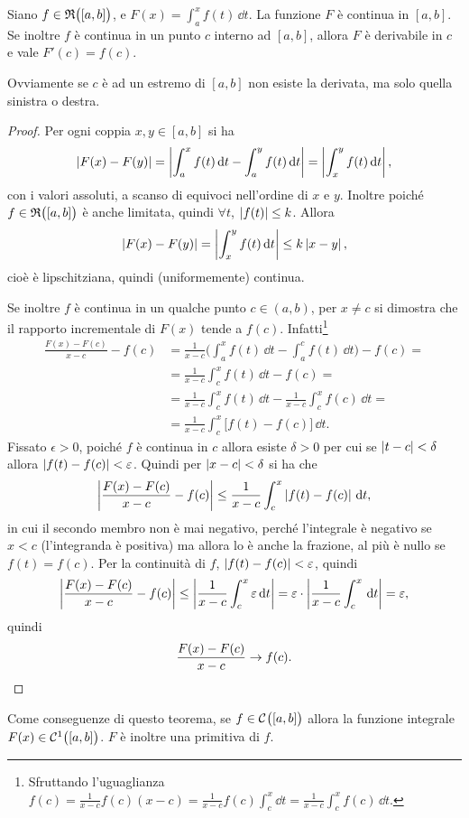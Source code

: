 \begin{teorema} \label{t:tfci1}
Siano $f\in\mathfrak{R}\big([a,b]\big)$, e $F(x)=\int_a^xf(t)\,\dd t$.
La funzione $F$ è continua in $[a,b]$. Se inoltre $f$ è continua in un punto $c$ interno ad $[a,b]$, allora $F$ è derivabile in $c$ e vale $F'(c)=f(c)$.
\end{teorema}
Ovviamente se $c$ è ad un estremo di $[a,b]$ non esiste la derivata, ma solo quella sinistra o destra.
\begin{proof}
Per ogni coppia $x,y\in[a,b]$ si ha
\[
\left|{F(x)-F(y)}\right|=\left|{\int_a^xf(t)\,\textup{d} t-\int_a^yf(t)\,\textup{d} t}\right|=\left|{\int_x^yf(t)\,\textup{d} t}\right|,
\]
con i valori assoluti, a scanso di equivoci nell'ordine di $x$ e $y$. Inoltre poiché $f\in\mathfrak{R}\big([a,b]\big)$ è anche limitata, quindi $\forall t$, $\left|{f(t)}\right|\leq k$. Allora
\[
\left|{F(x)-F(y)}\right|=\left|{\int_x^yf(t)\,\textup{d} t}\right|\leq k\left|{x-y}\right|,
\]
cioè è lipschitziana, quindi (uniformemente) continua.

Se inoltre $f$ è continua in un qualche punto $c\in(a,b)$, per $x\neq c$ si dimostra che il rapporto incrementale di $F(x)$ tende a $f(c)$. Infatti\footnote{Sfruttando l'uguaglianza $f(c)=\frac1{x-c}f(c)(x-c)=\frac1{x-c}f(c)\int_c^x\dd t=\frac1{x-c}\int_c^xf(c)\,\dd t$.}
\[
\begin{split}
\frac{F(x)-F(c)}{x-c}-f(c)	&=\frac1{x-c}\bigg(\int_a^xf(t)\,\dd t-\int_a^cf(t)\,\dd t\bigg)-f(c)=\\
						&=\frac1{x-c}\int_c^xf(t)\,\dd t-f(c)=\\
						&=\frac1{x-c}\int_c^xf(t)\,\dd t-\frac1{x-c}\int_c^xf(c)\,\dd t=\\
						&=\frac1{x-c}\int_c^x\big[f(t)-f(c)\big]\,\dd t.
\end{split}
\]
Fissato $\epsilon>0$, poiché $f$ è continua in $c$ allora esiste $\delta>0$ per cui se $\left|{t-c}\right|<\delta$ allora $\left|{f(t)-f(c)}\right|<\varepsilon$. Quindi per $\left|{x-c}\right|<\delta$ si ha che
\[
\left|{\frac{F(x)-F(c)}{x-c}-f(c)}\right|\leq\frac1{x-c}\int_c^x\left|{f(t)-f(c)}\right|\,\textup{d} t,
\]
in cui il secondo membro non è mai negativo, perché l'integrale è negativo se $x<c$ (l'integranda è positiva) ma allora lo è anche la frazione, al più è nullo se $f(t)=f(c)$.
Per la continuità di $f$, $\left|{f(t)-f(c)}\right|<\varepsilon$, quindi
\[
\left|{\frac{F(x)-F(c)}{x-c}-f(c)}\right|\leq\left|{\frac1{x-c}\int_c^x\varepsilon\,\textup{d} t}\right|=\varepsilon\cdot\left|{\frac1{x-c}\int_c^x\,\textup{d} t}\right|=\varepsilon,
\]
quindi
\[
\frac{F(x)-F(c)}{x-c}\to f(c).\qedhere
\]
\end{proof}
Come conseguenze di questo teorema, se $f\in\mathcal{C}^{{}}\big([a,b]\big)$ allora la funzione integrale $F(x)\in\mathcal{C}^{{1}}\big([a,b]\big)$. $F$ è inoltre una primitiva di $f$.
